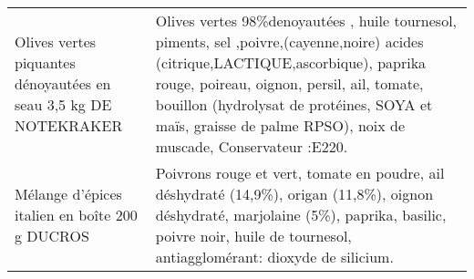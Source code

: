 \begin{longtable}{p{5cm}p{10cm}}
                                         Olives vertes piquantes dénoyautées en seau 3,5 kg DE NOTEKRAKER &                                                                                                                                                                                                                                                                                                                                                                                                                                                                                                                                                                                                                                                                                                                                           Olives vertes 98\%denoyautées , huile tournesol, piments, sel ,poivre,(cayenne,noire) acides (citrique,LACTIQUE,ascorbique), paprika rouge, poireau, oignon, persil, ail, tomate, bouillon (hydrolysat de protéines, SOYA et maïs, graisse de palme RPSO), noix de muscade, Conservateur :E220. \\
                                                           Mélange d'épices italien en boîte 200 g DUCROS &                                                                                                                                                                                                                                                                                                                                                                                                                                                                                                                                                                                                                                                                                                                                                                                                                           Poivrons rouge et vert, tomate en poudre, ail déshydraté (14,9\%), origan (11,8\%), oignon déshydraté, marjolaine (5\%), paprika, basilic, poivre noir, huile de tournesol, antiagglomérant: dioxyde de silicium. \\

\end{longtable}
